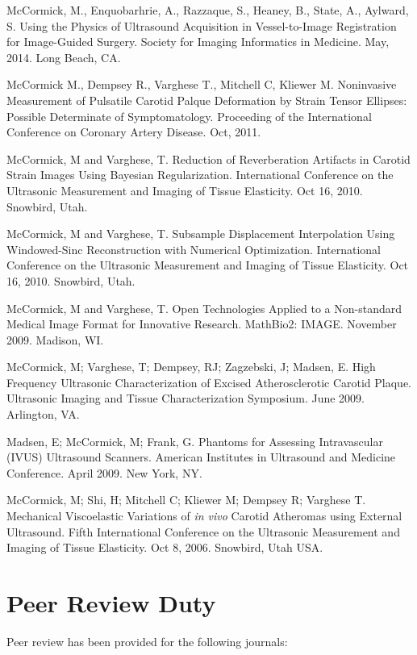 \documentclass[margin,line]{res}
\begin{document}
\begin{resume}
McCormick, M., Enquobarhrie, A., Razzaque, S., Heaney, B., State, A., Aylward,
S. Using the Physics of Ultrasound Acquisition in Vessel-to-Image Registration
for Image-Guided Surgery.  Society for Imaging Informatics in Medicine.  May,
2014. Long Beach, CA.

McCormick M., Dempsey R., Varghese T., Mitchell C, Kliewer M.  Noninvasive
Measurement of Pulsatile Carotid Palque Deformation by Strain Tensor Ellipses:
Possible Determinate of Symptomatology.  Proceeding of the International
Conference on Coronary Artery Disease.  Oct, 2011.

McCormick, M and Varghese, T.  Reduction of Reverberation Artifacts in Carotid
Strain Images Using Bayesian Regularization.  International Conference on the
Ultrasonic Measurement and Imaging of Tissue Elasticity.  Oct 16, 2010.
Snowbird, Utah.

McCormick, M and Varghese, T.  Subsample Displacement Interpolation Using
Windowed-Sinc Reconstruction with Numerical Optimization.  International
Conference on the Ultrasonic Measurement and Imaging of Tissue Elasticity.  Oct
16, 2010.  Snowbird, Utah.

McCormick, M and Varghese, T.  Open Technologies Applied to a Non-standard Medical
Image Format for Innovative Research.  MathBio2: IMAGE.  November 2009.  Madison, WI.

McCormick, M; Varghese, T; Dempsey, RJ; Zagzebski, J; Madsen, E.  High Frequency Ultrasonic Characterization of Excised Atherosclerotic
Carotid Plaque.  Ultrasonic Imaging and Tissue Characterization
Symposium.  June 2009.  Arlington, VA.

Madsen, E;  McCormick, M;  Frank, G.  Phantoms for Assessing
Intravascular (IVUS) Ultrasound Scanners.  American Institutes in
Ultrasound and Medicine Conference.  April 2009.  New York, NY.

McCormick, M; Shi, H; Mitchell C; Kliewer M; Dempsey R; Varghese T.   Mechanical
Viscoelastic Variations of \textit{in vivo} Carotid Atheromas using External
Ultrasound.  Fifth International Conference on the Ultrasonic Measurement and
Imaging of Tissue Elasticity.  Oct 8, 2006.  Snowbird, Utah USA.


\section{\sc Peer Review Duty}

Peer review has been provided for the following journals:


\end{resume}
\end{document}
